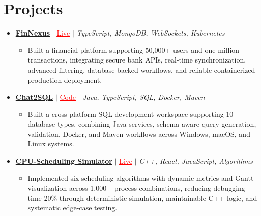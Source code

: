 \documentclass[letterpaper,10pt]{article}
\newcommand{\resumeItem}[1]{\item\small{{#1 \vspace{-2pt}}}}
\newcommand{\resumeProjectHeading}[1]{\item \small #1 \vspace{-2pt}}
\newcommand{\resumeProjectLink}[2]{\href{#1}{\textcolor{red}{\underline{#2}}}}
\newcommand{\resumeSubHeadingListStart}{\begin{itemize}[leftmargin=0.0in,label={}]}
\newcommand{\resumeSubHeadingListEnd}{\end{itemize}}
\newcommand{\resumeProjItemListStart}{\begin{itemize}[leftmargin=0.15in,label=\textbullet,itemsep=0pt,topsep=0pt,parsep=0pt,partopsep=0pt]}
\newcommand{\resumeProjItemListEnd}{\end{itemize}\vspace{1pt}}
\begin{document}
\section{Projects}
\resumeSubHeadingListStart
  \resumeProjectHeading{\href{https://fin-nexus.vercel.app/}{\textbf{FinNexus}} $|$ \resumeProjectLink{https://fin-nexus.vercel.app/}{Live} $|$ \emph{TypeScript, MongoDB, WebSockets, Kubernetes}}
  \resumeProjItemListStart
    \resumeItem{Built a financial platform supporting 50,000+ users and one million transactions, integrating secure bank APIs, real-time synchronization, advanced filtering, database-backed workflows, and reliable containerized production deployment.}
  \resumeProjItemListEnd
  \resumeProjectHeading{\href{https://github.com/SAHAJ-BHADJA/Chat2SQL}{\textbf{Chat2SQL}} $|$ \resumeProjectLink{https://github.com/SAHAJ-BHADJA/Chat2SQL}{Code} $|$ \emph{Java, TypeScript, SQL, Docker, Maven}}
  \resumeProjItemListStart
    \resumeItem{Built a cross-platform SQL development workspace supporting 10+ database types, combining Java services, schema-aware query generation, validation, Docker, and Maven workflows across Windows, macOS, and Linux systems.}
  \resumeProjItemListEnd
  \resumeProjectHeading{\href{https://cpu-scheduler-amber.vercel.app/}{\textbf{CPU-Scheduling Simulator}} $|$ \resumeProjectLink{https://cpu-scheduler-amber.vercel.app/}{Live} $|$ \emph{C++, React, JavaScript, Algorithms}}
  \resumeProjItemListStart
    \resumeItem{Implemented six scheduling algorithms with dynamic metrics and Gantt visualization across 1,000+ process combinations, reducing debugging time 20\% through deterministic simulation, maintainable C++ logic, and systematic edge-case testing.}
  \resumeProjItemListEnd
\resumeSubHeadingListEnd
\end{document}
